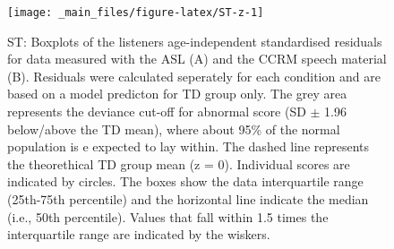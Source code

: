 \documentclass[a4paper, twoside]{templates/ociamthesis}
\begin{document}
\begin{figure}

{\centering \texttt{[image: \_main\_files/figure-latex/ST-z-1]} 

}

\caption{ST: Boxplots of the listeners age-independent standardised residuals for data measured with the ASL (A) and the CCRM speech material (B). Residuals were calculated seperately for each condition and are based on a model predicton for TD group only. The grey area represents the deviance cut-off for abnormal score (SD $\pm$ 1.96 below/above the TD mean), where about 95\% of the normal population is e expected to lay within. The dashed line represents the theorethical TD group mean (z = 0). Individual scores are indicated by circles. The boxes show the data interquartile range (25th-75th percentile) and the horizontal line indicate the median (i.e., 50th percentile). Values that fall within 1.5 times the interquartile range are indicated by the wiskers.}\label{fig:ST-z}
\end{figure}
\end{document}
